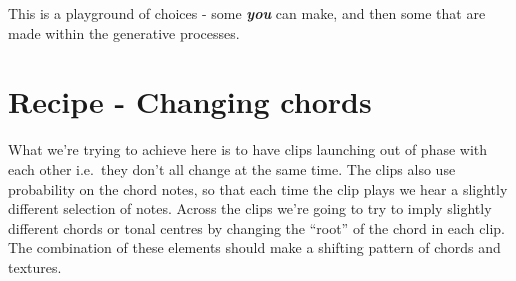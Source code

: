\documentclass[
  12pt,
  letterpaper,
  oneside,
  open=any]{scrbook}
\begin{document}
This is a playground of choices - some \textbf{\emph{you}} can make, and
then some that are made within the generative processes.


\chapter{Recipe - Changing
chords}\label{Chapter-001-Recipe-Changing_Chords}

\begin{tcolorbox}[enhanced jigsaw, colback=white, rightrule=.15mm, toprule=.15mm, arc=.35mm, opacitybacktitle=0.6, coltitle=black, leftrule=.75mm, bottomtitle=1mm, toptitle=1mm, left=2mm, bottomrule=.15mm, titlerule=0mm, colbacktitle=quarto-callout-tip-color!10!white, colframe=quarto-callout-tip-color-frame, title=\textcolor{quarto-callout-tip-color}{\faLightbulb}\hspace{0.5em}{Key idea}, breakable, opacityback=0]

What we're trying to achieve here is to have clips launching out of
phase with each other i.e.~they don't all change at the same time. The
clips also use probability on the chord notes, so that each time the
clip plays we hear a slightly different selection of notes. Across the
clips we're going to try to imply slightly different chords or tonal
centres by changing the ``root'' of the chord in each clip. The
combination of these elements should make a shifting pattern of chords
and textures.

\end{tcolorbox}
\end{document}

